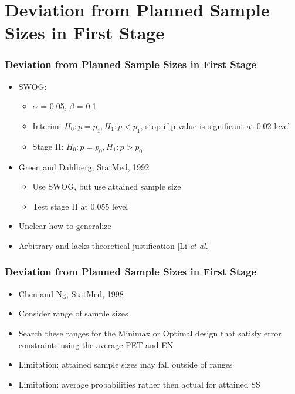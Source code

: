 \documentclass{beamer}\usepackage[]{graphicx}\usepackage[]{color}
\begin{document}
\section{Deviation from Planned Sample Sizes in First Stage}

\begin{frame}
\frametitle{Deviation from Planned Sample Sizes in First Stage}
    \begin{itemize}
        \item SWOG: 
        \begin{itemize}
            \item $\alpha$ = 0.05, $\beta$ = 0.1
            \item Interim: $H_0: p=p_1, H_1: p < p_1$, stop if p-value is significant at 0.02-level
            \item Stage II: $H_0: p=p_0, H_1: p > p_0$
        \end{itemize}
      \item Green and Dahlberg, StatMed, 1992
        \begin{itemize}
          \item Use SWOG, but use attained sample size
          \item Test stage II at 0.055 level %
        \end{itemize}
      \item Unclear how to generalize
      \item Arbitrary and lacks theoretical justification [Li \textit{et al.}]
    \end{itemize}
\end{frame}

\begin{frame}
\frametitle{Deviation from Planned Sample Sizes in First Stage}
    \begin{itemize}
      \item Chen and Ng, StatMed, 1998
      \item Consider range of sample sizes
      \item Search these ranges for the Minimax or Optimal design that satisfy error constraints using the average PET and EN
      \item Limitation: attained sample sizes may fall outside of ranges
      \item Limitation: average probabilities rather then actual for attained SS
    \end{itemize}
\end{frame}
\end{document}
